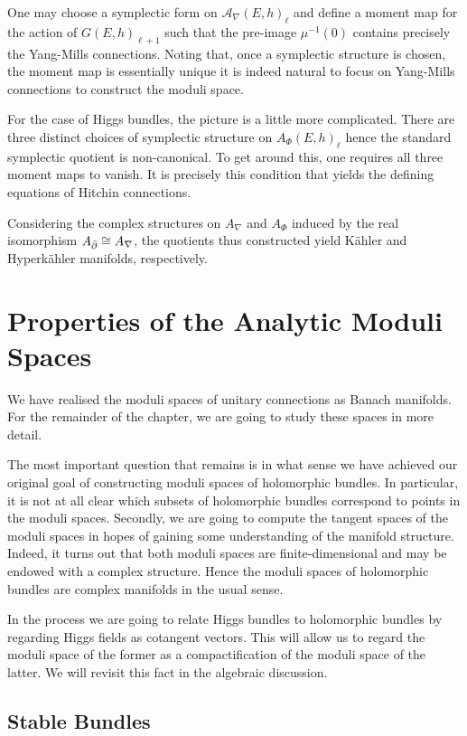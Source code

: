 \documentclass[12pt]{ociamthesis}  %
\begin{document}
One may choose a symplectic form on $\mathcal A_\nabla(E,h)_\ell$ and
define a moment map for the action of $G(E,h)_{\ell+1}$ such that the
pre-image $\mu^{-1}(0)$ contains precisely the Yang-Mills connections.
Noting that, once a symplectic structure is chosen, the moment map
is essentially unique it is indeed natural to focus on Yang-Mills
connections to construct the moduli space.

For the case of Higgs bundles, the picture is a little more complicated.
There are three distinct choices of symplectic structure on
$A_\Phi(E,h)_\ell$ hence the standard symplectic quotient is non-canonical.
To get around this, one requires all three moment maps to vanish. It is
precisely this condition that yields the defining equations of
Hitchin connections.

Considering the complex structures on $A_\nabla$ and $A_\Phi$ induced
by the real isomorphism $A_{\bar{\partial}}\cong A_\nabla$, the quotients
thus constructed yield K\"ahler and Hyperk\"ahler manifolds, respectively.

\section{Properties of the Analytic Moduli Spaces}

We have realised the moduli spaces of unitary connections as
Banach manifolds. For the remainder of the chapter, we are going to
study these spaces in more detail.

The most important question that remains is in what sense we have
achieved our original goal of constructing moduli spaces of
holomorphic bundles. In particular, it is not at all clear which subsets
of holomorphic bundles correspond to points in the moduli spaces.
Secondly, we are going to compute the tangent spaces of the moduli
spaces in hopes of gaining some understanding of the manifold structure.
Indeed, it turns out that both moduli spaces are finite-dimensional
and may be endowed with a complex structure. Hence the moduli spaces
of holomorphic bundles are complex manifolds in the usual sense.

In the process we are going to relate Higgs bundles to holomorphic bundles
by regarding Higgs fields as cotangent vectors. This will allow us to
regard the moduli space of the former as a compactification of the moduli
space of the latter. We will revisit this fact in the algebraic discussion.

\subsection{Stable Bundles}
\end{document}
